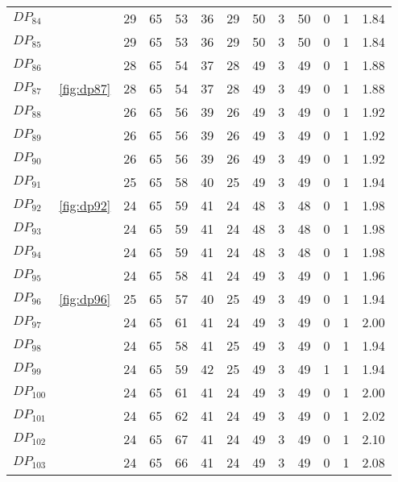 \documentclass{article}
\begin{document}
\begin{center}
\begin{tabular}{llrrrrrrrrrrr}
$DP_{84}$ &  & 29 & 65 & 53 & 36 & 29 & 50 & 3 & 50 & 0 & 1 & 1.84 \\
$DP_{85}$ &  & 29 & 65 & 53 & 36 & 29 & 50 & 3 & 50 & 0 & 1 & 1.84 \\
$DP_{86}$ &  & 28 & 65 & 54 & 37 & 28 & 49 & 3 & 49 & 0 & 1 & 1.88 \\
$DP_{87}$ & \ref{fig:dp87} & 28 & 65 & 54 & 37 & 28 & 49 & 3 & 49 & 0 & 1 & 1.88 \\
$DP_{88}$ &  & 26 & 65 & 56 & 39 & 26 & 49 & 3 & 49 & 0 & 1 & 1.92 \\
$DP_{89}$ &  & 26 & 65 & 56 & 39 & 26 & 49 & 3 & 49 & 0 & 1 & 1.92 \\
$DP_{90}$ &  & 26 & 65 & 56 & 39 & 26 & 49 & 3 & 49 & 0 & 1 & 1.92 \\
$DP_{91}$ &  & 25 & 65 & 58 & 40 & 25 & 49 & 3 & 49 & 0 & 1 & 1.94 \\
$DP_{92}$ & \ref{fig:dp92} & 24 & 65 & 59 & 41 & 24 & 48 & 3 & 48 & 0 & 1 & 1.98 \\
$DP_{93}$ &  & 24 & 65 & 59 & 41 & 24 & 48 & 3 & 48 & 0 & 1 & 1.98 \\
$DP_{94}$ &  & 24 & 65 & 59 & 41 & 24 & 48 & 3 & 48 & 0 & 1 & 1.98 \\
$DP_{95}$ &  & 24 & 65 & 58 & 41 & 24 & 49 & 3 & 49 & 0 & 1 & 1.96 \\
$DP_{96}$ & \ref{fig:dp96} & 25 & 65 & 57 & 40 & 25 & 49 & 3 & 49 & 0 & 1 & 1.94 \\
$DP_{97}$ &  & 24 & 65 & 61 & 41 & 24 & 49 & 3 & 49 & 0 & 1 & 2.00 \\
$DP_{98}$ &  & 24 & 65 & 58 & 41 & 25 & 49 & 3 & 49 & 0 & 1 & 1.94 \\
$DP_{99}$ &  & 24 & 65 & 59 & 42 & 25 & 49 & 3 & 49 & 1 & 1 & 1.94 \\
$DP_{100}$ &  & 24 & 65 & 61 & 41 & 24 & 49 & 3 & 49 & 0 & 1 & 2.00 \\
$DP_{101}$ &  & 24 & 65 & 62 & 41 & 24 & 49 & 3 & 49 & 0 & 1 & 2.02 \\
$DP_{102}$ &  & 24 & 65 & 67 & 41 & 24 & 49 & 3 & 49 & 0 & 1 & 2.10 \\
$DP_{103}$ &  & 24 & 65 & 66 & 41 & 24 & 49 & 3 & 49 & 0 & 1 & 2.08 \\
\bottomrule
\end{tabular}


\end{center}
\end{document}
